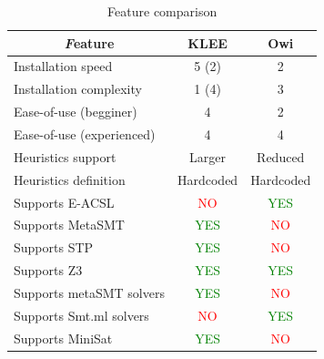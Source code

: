 \begin{table}[!ht]
    \centering
    \begin{tabular}{l|c|c}
       \multicolumn{1}{c|}{\textit Feature} & \multicolumn{1}{c|}{KLEE} & \multicolumn{1}{c}{Owi} \\
       \hline
       \hline
        Installation speed & 5 (2) & 2 \\
        Installation complexity & 1 (4) & 3 \\
        Ease-of-use (begginer) & 4 & 2 \\
        Ease-of-use (experienced) & 4 & 4 \\
        \hline
        \hline
        Heuristics support & Larger & Reduced \\
        Heuristics definition & Hardcoded & Hardcoded \\
        Supports E-ACSL & \textcolor{red}{NO} & \textcolor{green}{YES} \\
        \hline
        \hline
        Supports MetaSMT & \textcolor{green}{YES} & \textcolor{red}{NO} \\
        Supports STP & \textcolor{green}{YES} & \textcolor{red}{NO} \\
        Supports Z3 & \textcolor{green}{YES} & \textcolor{green}{YES} \\
        Supports metaSMT solvers & \textcolor{green}{YES} & \textcolor{red}{NO} \\
        Supports Smt.ml solvers & \textcolor{red}{NO} & \textcolor{green}{YES} \\
        Supports MiniSat & \textcolor{green}{YES} & \textcolor{red}{NO}\\
    \end{tabular}
    \caption{Feature comparison}
    \label{tab:feature_comparison}
\end{table}

